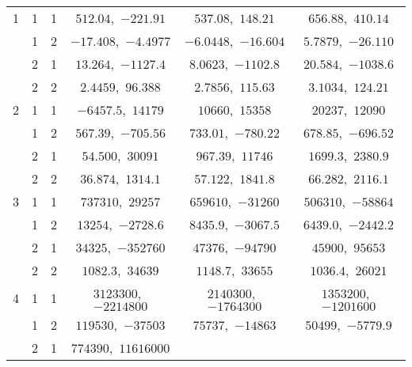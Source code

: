 \documentclass[12pt]{article}
\begin{document}
\begin{table}
\begin{center}
\begin{tabular}{|c|c|c|c|c|c|}
\hline
1 & 1 & 1 &
$          512.04    $,\   $         -221.91    $ & %
$537.08$,\  $148.21$ &
$          656.88    $,\   $          410.14    $\\
  & 1 & 2 &
$         -17.408    $,\   $         -4.4977    $ & %
$-6.0448$,\  $-16.604$ &
$          5.7879    $,\   $         -26.110    $\\
  & 2 & 1 &
$          13.264    $,\   $         -1127.4    $ & %
$8.0623$,\  $-1102.8$ &
$          20.584    $,\   $         -1038.6    $\\
  & 2 & 2 &
$          2.4459    $,\   $          96.388    $ & %
$2.7856$,\  $115.63$ &
$          3.1034    $,\   $          124.21    $\\
\hline
2 & 1 & 1 &
$         -6457.5    $,\   $          14179    $ & %
$10660$,\  $15358$ &
$          20237    $,\   $          12090    $\\
  & 1 & 2 &
$          567.39    $,\   $         -705.56    $ & %
$733.01$,\  $-780.22$ &
$          678.85    $,\   $         -696.52    $\\
  & 2 & 1 &
$          54.500    $,\   $          30091    $ & %
$967.39$,\  $11746$ &
$          1699.3    $,\   $          2380.9    $\\
  & 2 & 2 &
$          36.874    $,\   $          1314.1    $ & %
$57.122$,\  $1841.8$ &
$          66.282    $,\   $          2116.1    $\\
\hline
3 & 1 & 1 &
$         737310$,\   $          29257    $ & %
$659610$,\  $-31260$ &
$         506310$,\   $         -58864    $\\
  & 1 & 2 &
$          13254    $,\   $         -2728.6    $ & %
$8435.9$,\  $-3067.5$ &
$          6439.0    $,\   $         -2442.2    $\\
  & 2 & 1 &
$          34325    $,\   $        -352760$ & %
$47376$,\  $-94790$ &
$          45900    $,\   $          95653    $\\
  & 2 & 2 &
$          1082.3    $,\   $          34639    $ & %
$1148.7$,\  $33655$ &
$          1036.4    $,\   $          26021    $\\
\hline
4 & 1 & 1 &
$         3123300$,\   $        -2214800$ & %
$2140300$,\  $-1764300$ &
$         1353200$,\   $        -1201600$\\
  & 1 & 2 &
$         119530$,\   $         -37503    $ & %
$75737$,\  $-14863$ &
$          50499    $,\   $         -5779.9    $\\
  & 2 & 1 &
$         774390$,\   $         11616000$ & %

\end{tabular}
\end{center}
\end{table}
\end{document}
